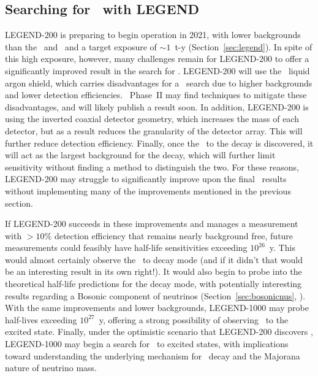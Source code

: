 \documentclass[/main.tex]{subfiles}
\begin{document}
\subsection{Searching for \bbes\ with LEGEND}
LEGEND-200 is preparing to begin operation in 2021, with lower backgrounds than the \MJD\ and \Gerda\ and a target exposure of ${\sim}1$~t-y (Section~\ref{sec:legend}).
In spite of this high exposure, however, many challenges remain for LEGEND-200 to offer a significantly improved result in the search for \bbes.
LEGEND-200 will use the \Gerda\ liquid argon shield, which carries disadvantages for a \bbes\ search due to higher backgrounds and lower detection efficiencies.
\Gerda\ Phase~II may find techniques to mitigate these disadvantages, and will likely publish a result soon.
In addition, LEGEND-200 is using the inverted coaxial detector geometry, which increases the mass of each detector, but as a result reduces the granularity of the detector array.
This will further reduce detection efficiency.
Finally, once the \bbes\ to the  decay is discovered, it will act as the largest background for the  decay, which will further limit sensitivity without finding a method to distinguish the two.
For these reasons, LEGEND-200 may struggle to significantly improve upon the final \MJD\ results without implementing many of the improvements mentioned in the previous section.

If LEGEND-200 succeeds in these improvements and manages a measurement with $>10\%$ detection efficiency that remains nearly background free, future measurements could feasibly have half-life sensitivities exceeding $10^{26}$~y.
This would almost certainly observe the \bbes\ to  decay mode (and if it didn't that would be an interesting result in its own right!).
It would also begin to probe into the theoretical half-life predictions for the  decay mode, with potentially interesting results regarding a Bosonic component of neutrinos (Section~\ref{sec:bosonicnus}, \cite{Tornow2010}).
With the same improvements and lower backgrounds, LEGEND-1000 may probe half-lives exceeding $10^{27}$~y, offering a strong possibility of observing \tnbb\ to the  excited state.
Finally, under the optimistic scenario that LEGEND-200 discovers \znbb, LEGEND-1000 may begin a search for \znbb\ to excited states, with implications toward understanding the underlying mechanism for \znbb\ decay and the Majorana nature of neutrino mass.

\onlyinsubfile{
  
  
}
\end{document}
